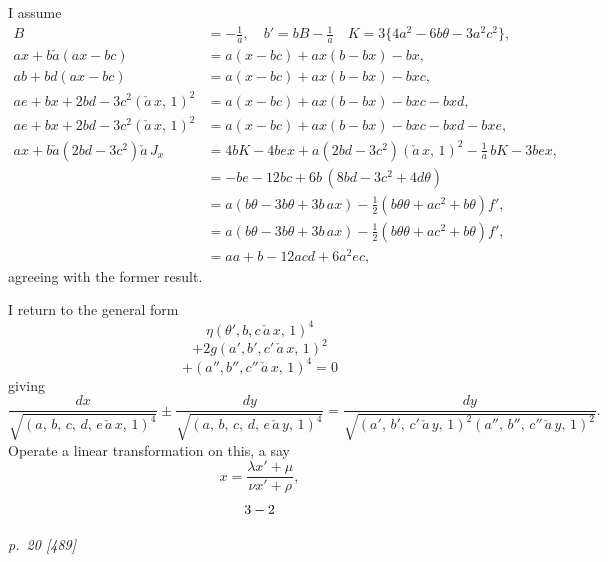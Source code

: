 \documentclass[11pt,a4paper]{book}
\begin{document}
I assume
\begin{align*}
B &= -\tfrac{1}{a}, \quad b' = bB - \tfrac{1}{a} \quad K = 3\{4a^2 - 6b\theta - 3a^2c^2\},\\
ax+b\check{a}(ax-bc) &= a(x-bc) + ax(b-bx) - bx,\\
ab+bd(ax-bc) &= a(x-bc) + ax(b-bx) - bxc,\\
ae+bx+2bd-3c^2(\check{a}\,x,\,1)^2 &= a(x-bc) + ax(b-bx) - bxc - bxd,\\
ae+bx+2bd-3c^2(\check{a}\,x,\,1)^2 &= a(x-bc) + ax(b-bx) - bxc - bxd - bxe,\\
ax+ b\check{a}(2bd-3c^2)\check{a}\,J_x &= 4bK - 4bex + a(2bd-3c^2)(\check{a}\,x,\,1)^2 - \tfrac{1}{a}\,bK - 3bex,\\
&= -be - 12bc + 6b\,(8bd - 3c^2 + 4d\theta)\\
&= a(b\theta - 3b\theta + 3b\,a x) - \tfrac{1}{2}(b\theta\theta + a c^2 + b\theta) f',\\
&= a(b\theta - 3b\theta + 3b\,a x) - \tfrac{1}{2}(b\theta\theta + a c^2 + b\theta) f',\\
&= aa + b - 12acd + 6a^2 ec,
\end{align*}
agreeing with the former result.

I return to the general form
\[
\eta(\theta', b, c\,\check{a}\,x,\,1)^4
\]
\[
+ 2g(a', b', c'\,\check{a}\,x,\,1)^2
\]
\[
+ (a'', b'', c''\,\check{a}\,x,\,1)^4 = 0
\]
giving
\[
\frac{dx}{\sqrt{(a,\,b,\,c,\,d,\,e\,\check{a}\,x,\,1)^4}} \pm \frac{dy}{\sqrt{(a,\,b,\,c,\,d,\,e\,\check{a}\,y,\,1)^4}} = \frac{dy}{\sqrt{(a',\,b',\,c'\,\check{a}\,y,\,1)^2(a'',\,b'',\,c''\,\check{a}\,y,\,1)^2}}.
\]
Operate a linear transformation on this, a say
\[
x = \frac{\lambda x' + \mu}{\nu x' + \rho},
\]
\[
\hfill 3-2
\]

\clearpage

\bigskip
\textit{p.~20 [489]}
\smallskip
\end{document}
